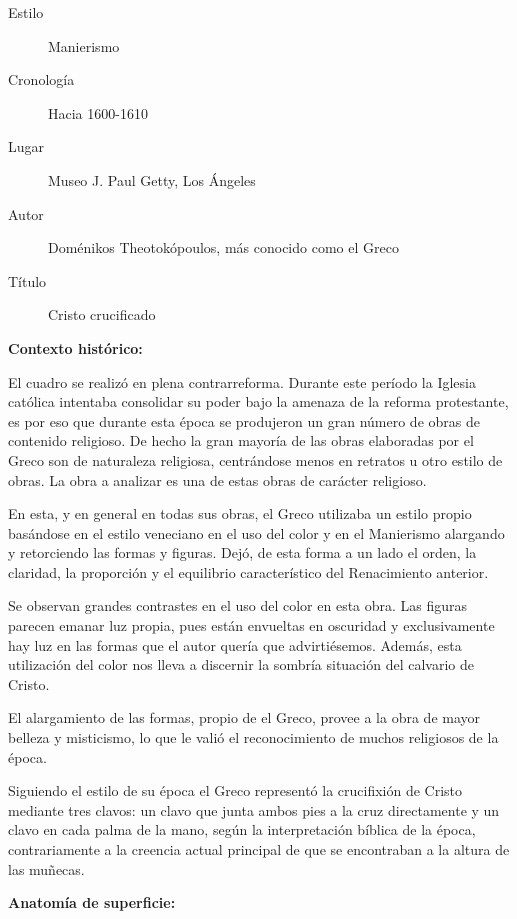 \begin{description}
\item[Estilo] Manierismo
\item[Cronología] Hacia 1600-1610
\item[Lugar] Museo J. Paul Getty, Los Ángeles
\item[Autor] Doménikos Theotokópoulos, más conocido como el Greco
\item[Título] Cristo crucificado
\end{description}

\textbf{Contexto histórico:}

El cuadro se realizó en plena contrarreforma. Durante este período la Iglesia católica intentaba consolidar su poder bajo la amenaza de la reforma protestante, es por eso que durante esta época se produjeron un gran número de obras de contenido religioso. De hecho la gran mayoría de las obras elaboradas por el Greco son de naturaleza religiosa, centrándose menos en retratos u otro estilo de obras. La obra a analizar es una de estas obras de carácter religioso.

En esta, y en general en todas sus obras, el Greco utilizaba un estilo propio basándose en el estilo veneciano en el uso del color y en el Manierismo alargando y retorciendo las formas y figuras. Dejó, de esta forma a un lado el orden, la claridad, la proporción y el equilibrio característico del Renacimiento anterior.

Se observan grandes contrastes en el uso del color en esta obra. Las figuras parecen emanar luz propia, pues están envueltas en oscuridad y exclusivamente hay luz en las formas que el autor quería que advirtiésemos. Además, esta utilización del color nos lleva a discernir la sombría situación del calvario de Cristo.

El alargamiento de las formas, propio de el Greco, provee a la obra de mayor belleza y misticismo, lo que le valió el reconocimiento de muchos religiosos de la época.

Siguiendo el estilo de su época el Greco representó la crucifixión de Cristo mediante tres clavos: un clavo que junta ambos pies a la cruz directamente y un clavo en cada palma de la mano, según la interpretación bíblica de la época, contrariamente a la creencia actual principal de que se encontraban a la altura de las muñecas.


\vspace{12pt}
\textbf{Anatomía de superficie:}

